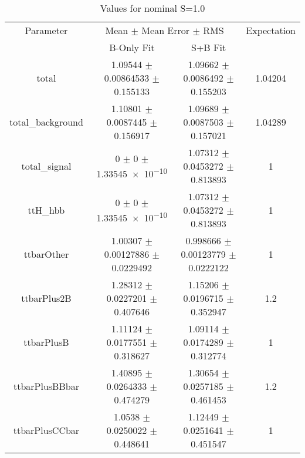 \begin{table}
\centering
\caption{Values for nominal S=1.0}
\begin{tabular}{cccc}
\toprule
Parameter & \multicolumn{2}{c}{Mean $\pm$ Mean Error $\pm$ RMS} & Expectation\\
 & B-Only Fit & S+B Fit & \\
\midrule
total & \num{1.09544} $\pm$ \num{0.00864533} $\pm$ \num{0.155133} & \num{1.09662} $\pm$ \num{0.0086492} $\pm$ \num{0.155203} & \num{1.04204}\\
total\_background & \num{1.10801} $\pm$ \num{0.0087445} $\pm$ \num{0.156917} & \num{1.09689} $\pm$ \num{0.0087503} $\pm$ \num{0.157021} & \num{1.04289}\\
total\_signal & \num{0} $\pm$ \num{0} $\pm$ \num{1.33545e-10} & \num{1.07312} $\pm$ \num{0.0453272} $\pm$ \num{0.813893} & \num{1}\\
ttH\_hbb & \num{0} $\pm$ \num{0} $\pm$ \num{1.33545e-10} & \num{1.07312} $\pm$ \num{0.0453272} $\pm$ \num{0.813893} & \num{1}\\
ttbarOther & \num{1.00307} $\pm$ \num{0.00127886} $\pm$ \num{0.0229492} & \num{0.998666} $\pm$ \num{0.00123779} $\pm$ \num{0.0222122} & \num{1}\\
ttbarPlus2B & \num{1.28312} $\pm$ \num{0.0227201} $\pm$ \num{0.407646} & \num{1.15206} $\pm$ \num{0.0196715} $\pm$ \num{0.352947} & \num{1.2}\\
ttbarPlusB & \num{1.11124} $\pm$ \num{0.0177551} $\pm$ \num{0.318627} & \num{1.09114} $\pm$ \num{0.0174289} $\pm$ \num{0.312774} & \num{1}\\
ttbarPlusBBbar & \num{1.40895} $\pm$ \num{0.0264333} $\pm$ \num{0.474279} & \num{1.30654} $\pm$ \num{0.0257185} $\pm$ \num{0.461453} & \num{1.2}\\
ttbarPlusCCbar & \num{1.0538} $\pm$ \num{0.0250022} $\pm$ \num{0.448641} & \num{1.12449} $\pm$ \num{0.0251641} $\pm$ \num{0.451547} & \num{1}\\
\bottomrule
\end{tabular}
\end{table}